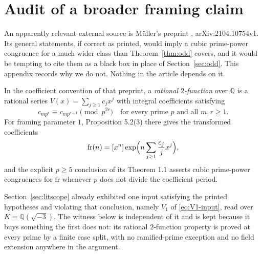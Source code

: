 \documentclass[11pt,a4paper]{article}
\numberwithin{equation}{section}
\theoremstyle{definition}
\theoremstyle{remark}
\newcommand{\Q}{\mathbb Q}
\begin{document}
\section{Audit of a broader framing claim}
\label{app:audit}

An apparently relevant external source is M\"uller's preprint
\cite{muller}, arXiv:2104.10754v1. Its general statements, if correct as
printed, would imply a cubic prime-power congruence for a much wider class
than Theorem~\ref{thm:odd} covers, and it would be tempting to cite them as
a black box in place of Section~\ref{sec:odd}. This appendix records why we
do not. Nothing in the article depends on it.

In the coefficient convention of that preprint, a \emph{rational
$2$-function} over $\Q$ is a rational series $V(x)=\sum_{j\ge1}c_jx^j$ with
integral coefficients satisfying
\begin{equation}\label{eq:two-function}
 c_{mp^r}\equiv c_{mp^{r-1}}\pmod{p^{2r}}
 \quad\text{for every prime }p\text{ and all }m,r\ge1.
\end{equation}
For framing parameter $1$, Proposition 5.2(3) there gives the transformed
coefficients
\begin{equation}\label{eq:framing}
 \mathrm{fr}(n)=[x^n]\exp\Bigl(n\sum_{j\ge1}\frac{c_j}{j}x^j\Bigr),
\end{equation}
and the explicit $p\ge5$ conclusion of its Theorem 1.1 asserts cubic
prime-power congruences for $\mathrm{fr}$ whenever $p$ does not divide the
coefficient period.

Section~\ref{sec:litscope} already exhibited one input satisfying the printed
hypotheses and violating that conclusion, namely $V_1$ of
\eqref{eq:V1-input}, read over $K=\Q(\sqrt{-3})$. The witness below is
independent of it and is kept because it buys something the first does not:
its rational $2$-function property is proved at every prime by a finite case
split, with no ramified-prime exception and no field extension anywhere in
the argument.
\end{document}
